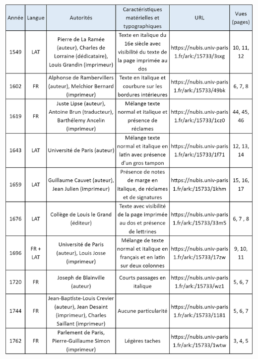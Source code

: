 \documentclass[a4paper,12pt,twoside]{book}
\begin{document}
\begin{table} [H]
\includegraphics[width=6in,height=7.8in]{vertopal_157ae480aa4a4b07be198b586a812241/media/image21.png}
\end{table}
\end{document}
